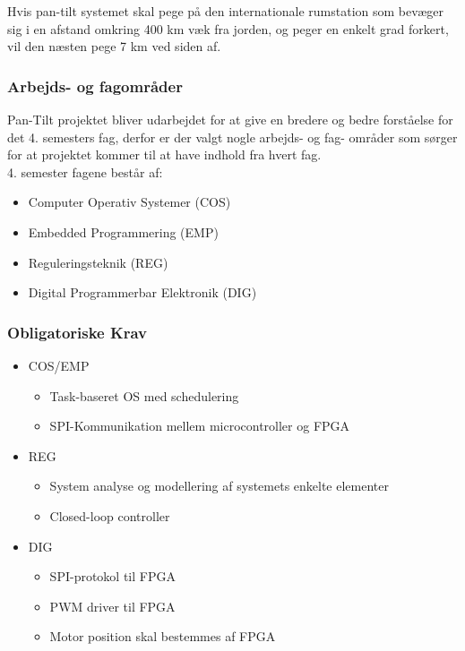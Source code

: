 Hvis pan-tilt systemet skal pege på den internationale rumstation som bevæger sig i en afstand omkring 400 km væk fra jorden, og peger en enkelt grad forkert, vil den næsten pege 7 km ved siden af.



\subsubsection{Arbejds- og fagområder}
Pan-Tilt projektet bliver udarbejdet for at give en bredere og bedre forståelse for det 4. semesters fag, derfor er der valgt nogle arbejds- og fag- områder som sørger for at projektet kommer til at have indhold fra hvert fag.\\
4. semester fagene består af:
\begin{itemize}[noitemsep]
	\item Computer Operativ Systemer (COS)
	\item Embedded Programmering (EMP)
	\item Reguleringsteknik (REG)
	\item Digital Programmerbar Elektronik (DIG)
\end{itemize}

\subsubsection{Obligatoriske Krav}

\begin{itemize}[noitemsep]
	\item COS/EMP
	\begin{itemize}[noitemsep]
		\item Task-baseret OS med schedulering
		\item SPI-Kommunikation mellem microcontroller og FPGA
	\end{itemize}
	\item REG
	\begin{itemize}[noitemsep]
		\item System analyse og modellering af systemets enkelte elementer
		\item Closed-loop controller
	\end{itemize}
	\item DIG
	\begin{itemize}[noitemsep]
		\item SPI-protokol til FPGA
		\item PWM driver til FPGA
		\item Motor position skal bestemmes af FPGA
	\end{itemize}
\end{itemize}

